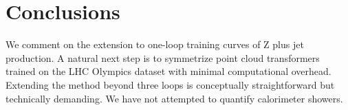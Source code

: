 \section{Conclusions}\label{sec:conclusions}

We comment on the extension to one-loop training curves of Z plus jet
production. A natural next step is to symmetrize point cloud
transformers trained on the LHC Olympics dataset with minimal
computational overhead. Extending the method beyond three loops is
conceptually straightforward but technically demanding. We have not
attempted to quantify calorimeter showers.

